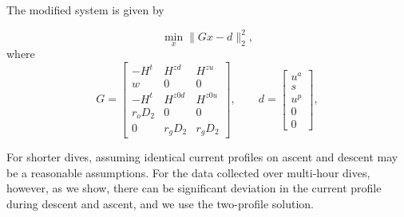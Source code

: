 The modified system is given by 

$$
\min_x{\|{Gx-d}\|_2^2},
$$
where
$$
G=
\begin{bmatrix}
-H^t  &H^{zd} & H^{zu} \\
w & 0 & 0\\
 -H^t & H^{z0d} &H^{z0u} \\
r_o D_2 & 0 & 0\\
0  & r_gD_2 & r_gD_2 
\end{bmatrix}, \qquad 
d=\begin{bmatrix}{u^a}\\ s\\  u^p \\ 0 \\ 0  \end{bmatrix},
$$



For shorter dives, assuming identical current profiles on ascent and descent may be a reasonable assumptions. For the data collected over multi-hour dives, however, as we show, there can be significant deviation in the current profile during descent and ascent, and we use the two-profile solution.
